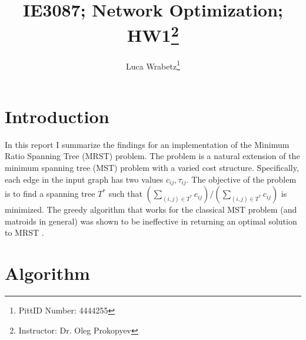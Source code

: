 \documentclass[11pt]{article}
\title{IE3087; Network Optimization; HW1\thanks{Instructor: Dr. Oleg Prokopyev}}
\author{Luca Wrabetz\thanks{PittID Number: 4444255}}
\theoremstyle{instance}
\theoremstyle{question}
\theoremstyle{theorem}
\theoremstyle{theorem}
\theoremstyle{theorem}
\begin{document}
\maketitle
    \section*{Introduction}
    In this report I summarize the findings for an implementation of the Minimum Ratio Spanning Tree (MRST) problem. The problem is a natural extension of the minimum spanning tree (MST) problem with a varied cost structure. Specifically, each edge in the input graph has two values $c_{ij}, \tau_{ij}$. The objective of the problem is to find a spanning tree $T^{*}$ such that $(\sum_{(i,j) \in T^{*}} c_{ij}) / (\sum_{(i,j) \in T^{*}} c_{ij})$ is minimized. The greedy algorithm that works for the classical MST problem (and matroids in general) was shown to be ineffective in returning an optimal solution to MRST \cite{chandrasekaran1977minimal}.
    
    \section{Algorithm}
    

    \clearpage
    
    	
\end{document}
